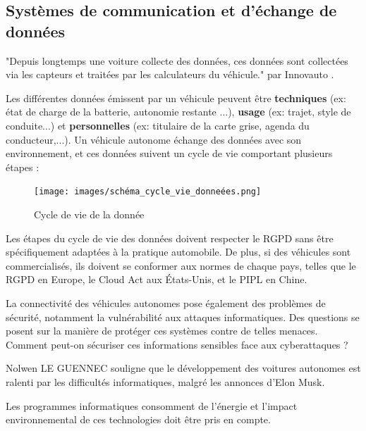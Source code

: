 \documentclass{article}
\begin{document}
\subsection{Systèmes de communication et d’échange de données}
"Depuis longtemps une voiture collecte des données, ces données sont collectées via les capteurs et traitées par les calculateurs du véhicule." par Innovauto \cite{donnees_echange}.

Les différentes données émissent par un véhicule peuvent être \textbf{techniques} (ex: état de charge de la batterie, autonomie restante ...), \textbf{usage} (ex: trajet, style de conduite...) et \textbf{personnelles} (ex: titulaire de la carte grise, agenda du conducteur,...).
Un véhicule autonome échange des données avec son environnement, et ces données suivent un cycle de vie comportant plusieurs étapes :

\begin{figure}[h]
    \centering
    \texttt{[image: images/schéma\_cycle\_vie\_donneées.png]} 
    \caption{Cycle de vie de la donnée}
\end{figure}

Les étapes du cycle de vie des données doivent respecter le RGPD sans être spécifiquement adaptées à la pratique automobile. De plus, si des véhicules sont commercialisés, ils doivent se conformer aux normes de chaque pays, telles que le RGPD en Europe, le Cloud Act aux États-Unis, et le PIPL en Chine.

La connectivité des véhicules autonomes pose également des problèmes de sécurité, notamment la vulnérabilité aux attaques informatiques. Des questions se posent sur la manière de protéger ces systèmes contre de telles menaces. Comment peut-on sécuriser ces informations sensibles face aux cyberattaques ?

Nolwen LE GUENNEC\cite{le_gennec_machine_2023} souligne que le développement des voitures autonomes est ralenti par les difficultés informatiques, malgré les annonces d’Elon Musk. 


Les programmes informatiques consomment de l’énergie et l'impact environnemental de ces technologies doit être pris en compte.
\end{document}
